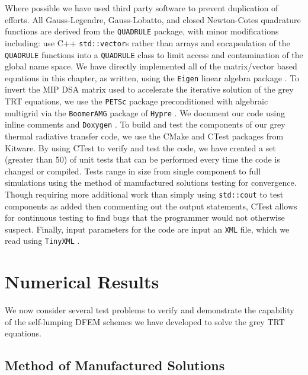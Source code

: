Where possible we have used third party software to prevent duplication of  efforts.
All Gauss-Legendre, Gauss-Lobatto, and closed Newton-Cotes quadrature functions are derived from the \verb+QUADRULE+ \cite{quadrule} package, with minor modifications including: use C++ \verb+std::vector+s rather than arrays and encapsulation of the \verb+QUADRULE+ functions into a \verb+QUADRULE+ class to limit access and contamination of the global name space.
We have directly implemented all of the matrix/vector based equations in this chapter, as written, using the \verb+Eigen+ linear algebra package \cite{eigen}.
To invert the MIP DSA matrix used to accelerate the iterative solution of the grey TRT equations, we use the \verb+PETSc+ package\cite{petsc} preconditioned with algebraic multigrid\cite{mip_mc} via the \verb+BoomerAMG+ package of \verb+Hypre+ \cite{hypre}.
We document our code using  inline comments  and \verb+Doxygen+ \cite{doxygen}.
To build and test the components of our grey thermal radiative transfer code, we use the CMake and CTest packages from Kitware\cite{cmake}.
By using CTest to verify and test the code, we have created a set (greater than 50) of unit tests that can be performed every time the code is changed or compiled.
Tests range in size from single component to full simulations using the method of manufactured solutions\cite{mms} testing for convergence.
Though requiring more additional work than simply using \verb+std::cout+ to test components as added then commenting out the output statements, CTest allows for continuous testing to find bugs that the programmer would not otherwise suspect.
Finally, input parameters for the code are input an \verb+XML+ file, which we read using \verb+TinyXML+ \cite{xml}. 

\section{Numerical Results}
\label{sec:chap6_results}

We now consider several test problems to verify and demonstrate the capability of the self-lumping DFEM schemes we have developed to solve the grey TRT equations.

\subsection{Method of Manufactured Solutions}

